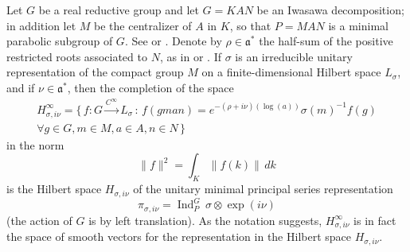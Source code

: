 \documentclass[leqno,11pt]{amsart}
\numberwithin{equation}{subsection}
\theoremstyle{plain}
\theoremstyle{definition}
\theoremstyle{remark}
\begin{document}
Let $G$ be a real reductive group and let $G=KAN$ be an Iwasawa decomposition; in addition let   $M$ be the centralizer of $A$ in $K$, so that $P=MAN$ is a minimal parabolic subgroup of $G$.  See \cite[Chs.~VI,VII]{KnappBeyond} or \cite{VoganGreenBook}.  Denote by  $\rho\in \mathfrak{a}^*$  the half-sum of the positive restricted roots associated to $N$, as in \cite{KnappBeyond} or \cite{VoganGreenBook}.   If $\sigma$ is an irreducible   unitary representation of the compact group $M$ on a finite-dimensional Hilbert space $L_\sigma$, and if $\nu \in \mathfrak{a}^*$, then the completion of the space 
\begin{multline}
\label{eq-smooth-vectors-in-principal-series}
H^\infty _{\sigma,i\nu} = \bigl \{ \,  f\colon G \stackrel{C^\infty}\to  L_\sigma \, : \, 
f(gman) = e^{-(\rho + i \nu) (\log (a)) } \sigma(m)^{-1} f(g)
\\
\forall g\in G, m\in M , a\in A, n\in N
\,\}
\end{multline}
in the norm 
\begin{equation} 
\label{eq-l-2-norm-on-k}
\| f\| ^2 = \int_K \| f(k) \|\, dk
\end{equation}
is the Hilbert space $H_{\sigma,  i\nu}$ of the unitary minimal principal series representation 
\[
\pi_{\sigma,  i \nu} = \operatorname{Ind}_P^G \, \sigma {\otimes}\! \exp( i \nu)
\]
(the action of $G$ is by left translation). As the notation suggests, $H^\infty _{\sigma, i \nu}$ is in fact the space of smooth vectors for the representation in the Hilbert space $H_{\sigma, i \nu}$.
\end{document}
